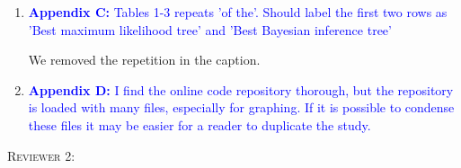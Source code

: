 \documentclass[12pt,letterpaper]{article}
\renewcommand{\section}[1]{%
\bigskip
\begin{center}
\begin{Large}
\normalfont\scshape #1
\medskip
\end{Large}
\end{center}}
\begin{document}
\begin{enumerate}
\item{\textcolor{blue}{\textbf{Appendix C:} Tables 1-3 repeats 'of the'. Should label the first two rows as 'Best maximum likelihood tree' and 'Best Bayesian inference tree'}}

We removed the repetition in the caption. %

\item{\textcolor{blue}{\textbf{Appendix D:} I find the online code repository thorough, but the repository is loaded with many files, especially for graphing. If it is possible to condense these files it may be easier for a reader to duplicate the study.}}


\end{enumerate}

\section{Reviewer 2:}
\end{document}
